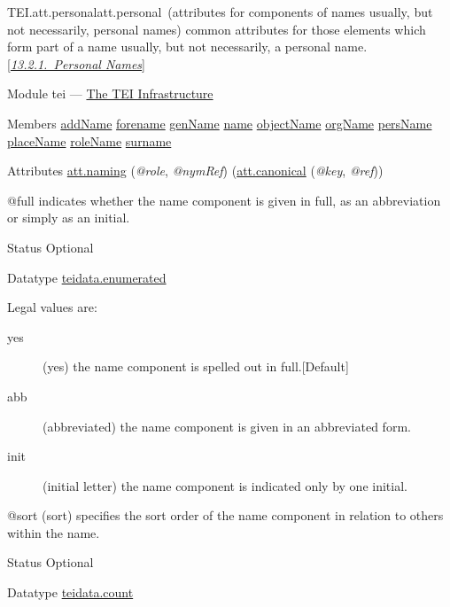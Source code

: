 \begin{reflist}
\item[]\begin{specHead}{TEI.att.personal}{att.personal} (attributes for components of names usually, but not necessarily, personal names) common attributes for those elements which form part of a name usually, but not necessarily, a personal name. [\textit{\hyperref[NDPER]{13.2.1.\ Personal Names}}]\end{specHead} 
    \item[{Module}]
  tei — \hyperref[ST]{The TEI Infrastructure}
    \item[{Members}]
  \hyperref[TEI.addName]{addName} \hyperref[TEI.forename]{forename} \hyperref[TEI.genName]{genName} \hyperref[TEI.name]{name} \hyperref[TEI.objectName]{objectName} \hyperref[TEI.orgName]{orgName} \hyperref[TEI.persName]{persName} \hyperref[TEI.placeName]{placeName} \hyperref[TEI.roleName]{roleName} \hyperref[TEI.surname]{surname}
    \item[{Attributes}]
  \hyperref[TEI.att.naming]{att.naming} (\textit{@role}, \textit{@nymRef})  (\hyperref[TEI.att.canonical]{att.canonical} (\textit{@key}, \textit{@ref})) \hfil\\[-10pt]\begin{sansreflist}
    \item[@full]
  indicates whether the name component is given in full, as an abbreviation or simply as an initial.
\begin{reflist}
    \item[{Status}]
  Optional
    \item[{Datatype}]
  \hyperref[TEI.teidata.enumerated]{teidata.enumerated}
    \item[{Legal values are:}]
  \begin{description}

\item[{yes}](yes) the name component is spelled out in full.{[Default] }
\item[{abb}](abbreviated) the name component is given in an abbreviated form.
\item[{init}](initial letter) the name component is indicated only by one initial.
\end{description} 
\end{reflist}  
    \item[@sort]
  (sort) specifies the sort order of the name component in relation to others within the name.
\begin{reflist}
    \item[{Status}]
  Optional
    \item[{Datatype}]
  \hyperref[TEI.teidata.count]{teidata.count}
\end{reflist}  
\end{sansreflist}  
\end{reflist}  
